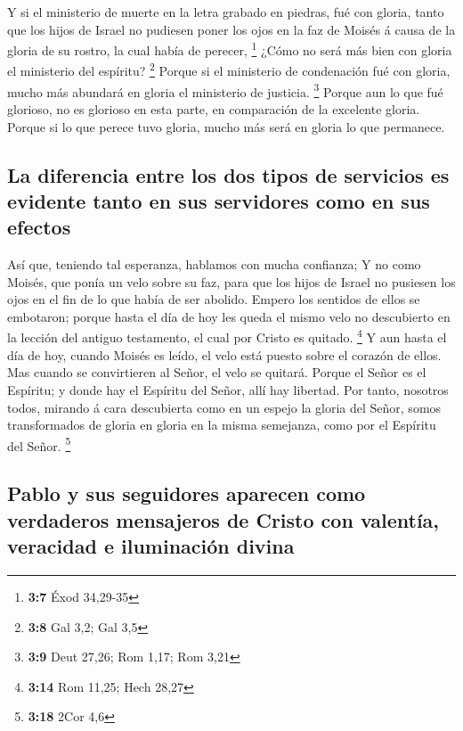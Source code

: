  Y si el ministerio de muerte en la letra grabado en
piedras, fué con gloria, tanto que los hijos de Israel no pudiesen poner
los ojos en la faz de Moisés á causa de la gloria de su rostro, la cual
había de perecer, \footnote{\textbf{3:7} Éxod 34,29-35} 
¿Cómo no será más bien con gloria el ministerio del espíritu?
\footnote{\textbf{3:8} Gal 3,2; Gal 3,5}  Porque si el
ministerio de condenación fué con gloria, mucho más abundará en gloria
el ministerio de justicia. \footnote{\textbf{3:9} Deut 27,26; Rom 1,17;
  Rom 3,21}  Porque aun lo que fué glorioso, no es
glorioso en esta parte, en comparación de la excelente gloria.
 Porque si lo que perece tuvo gloria, mucho más será en
gloria lo que permanece.

\hypertarget{la-diferencia-entre-los-dos-tipos-de-servicios-es-evidente-tanto-en-sus-servidores-como-en-sus-efectos}{%
\subsection{La diferencia entre los dos tipos de servicios es evidente
tanto en sus servidores como en sus
efectos}\label{la-diferencia-entre-los-dos-tipos-de-servicios-es-evidente-tanto-en-sus-servidores-como-en-sus-efectos}}

 Así que, teniendo tal esperanza, hablamos con mucha
confianza;  Y no como Moisés, que ponía un velo sobre su
faz, para que los hijos de Israel no pusiesen los ojos en el fin de lo
que había de ser abolido.  Empero los sentidos de ellos
se embotaron; porque hasta el día de hoy les queda el mismo velo no
descubierto en la lección del antiguo testamento, el cual por Cristo es
quitado. \footnote{\textbf{3:14} Rom 11,25; Hech 28,27} 
Y aun hasta el día de hoy, cuando Moisés es leído, el velo está puesto
sobre el corazón de ellos.  Mas cuando se convirtieren al
Señor, el velo se quitará.  Porque el Señor es el
Espíritu; y donde hay el Espíritu del Señor, allí hay libertad.
 Por tanto, nosotros todos, mirando á cara descubierta
como en un espejo la gloria del Señor, somos transformados de gloria en
gloria en la misma semejanza, como por el Espíritu del Señor.
\footnote{\textbf{3:18} 2Cor 4,6}

\hypertarget{pablo-y-sus-seguidores-aparecen-como-verdaderos-mensajeros-de-cristo-con-valentuxeda-veracidad-e-iluminaciuxf3n-divina}{%
\subsection{Pablo y sus seguidores aparecen como verdaderos mensajeros
de Cristo con valentía, veracidad e iluminación
divina}\label{pablo-y-sus-seguidores-aparecen-como-verdaderos-mensajeros-de-cristo-con-valentuxeda-veracidad-e-iluminaciuxf3n-divina}}

